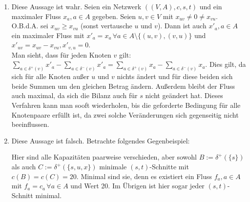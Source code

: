 \documentclass[a4paper,12pt,german]{scrartcl}
\begin{document}
\begin{enumerate}
  \item Diese Aussage ist wahr. Seien ein Netzwerk $((V,A),c,s,t)$ und ein maximaler Fluss $x_a,a\in A$ gegeben. Seien $u,v\in V$ mit $x_{uv}\neq0\neq x_{vu}$. O.B.d.A. sei $x_{uv}\geq x_{vu}$ (sonst vertausche $u$ und $v$). Dann ist auch $x'_{a},a\in A$ ein maximaler Fluss mit $x'_a=x_a\,\forall a\in A\setminus\{(u,v),(v,u)\}$ und $x'_{uv}=x_{uv}-x_{vu},x'_{v,u}=0$.\\
  Man sieht, dass für jeden Knoten $v$ gilt: $\sum\limits_{a\in\delta^+(v)}x'_a-\sum\limits_{a\in\delta^-(v)}x'_a=\sum\limits_{a\in\delta^+(v)}x_a-\sum\limits_{a\in\delta^-(v)}x_a$. Dies gilt, da sich für alle Knoten außer $u$ und $v$ nichts ändert und für diese beiden sich beide Summen um den gleichen Betrag ändern. Außerdem bleibt der Fluss auch maximal, da sich die Bilanz auch für $s$ nicht geändert hat. Dieses Verfahren kann man sooft wiederholen, bis die geforderte Bedingung für alle Knotenpaare erfüllt ist, da zwei solche Veränderungen sich gegenseitig nicht beeinflussen.
  \item Diese Aussage ist falsch. Betrachte folgendes Gegenbeispiel:
    \begin{center}
    \end{center}
    Hier sind alle Kapazitäten paarweise verschieden, aber sowohl $B:=\delta^+(\{s\})$ als auch $C:=\delta^+(\{s,u,x\})$ minimale $(s,t)$-Schnitte mit $c(B)=c(C)=20$. Minimal sind sie, denn es existiert ein Fluss $f_a,a\in A$ mit $f_a=c_a\,\forall a\in A$ und Wert 20. Im Übrigen ist hier sogar jeder $(s,t)$-Schnitt minimal.
    

\end{enumerate}
\end{document}
